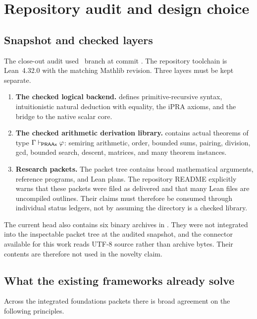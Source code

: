 \section{Repository audit and design choice}

\subsection{Snapshot and checked layers}

The close-out audit used \repo\ branch  at commit
.  The repository toolchain is
Lean~4.32.0 with the matching Mathlib revision.  Three layers must be kept
separate.

\begin{enumerate}
\item \textbf{The checked logical backend.}
 defines primitive-recursive syntax, intuitionistic natural
deduction with equality, the iPRA axioms, and the bridge to the native scalar
core.

\item \textbf{The checked arithmetic derivation library.}
 contains actual theorems of type
\(\Gamma\mathrel{\vdash_{\!\mathsf{PRAAx}}}\varphi\): semiring arithmetic, order, bounded sums,
pairing, division, gcd, bounded search, descent, matrices, and many theorem
instances.

\item \textbf{Research packets.}
The packet tree contains broad mathematical arguments, reference programs, and
Lean plans.  The repository README explicitly warns that these packets were
filed as delivered and that many Lean files are uncompiled outlines.  Their
claims must therefore be consumed through individual status ledgers, not by
assuming the directory is a checked library.
\end{enumerate}

The current head also contains six binary archives in
.  They were not integrated into the inspectable packet
tree at the audited snapshot, and the connector available for this work reads
UTF-8 source rather than archive bytes.  Their contents are therefore not used
in the novelty claim.

\subsection{What the existing frameworks already solve}

Across the integrated foundations packets there is broad agreement on the
following principles.

